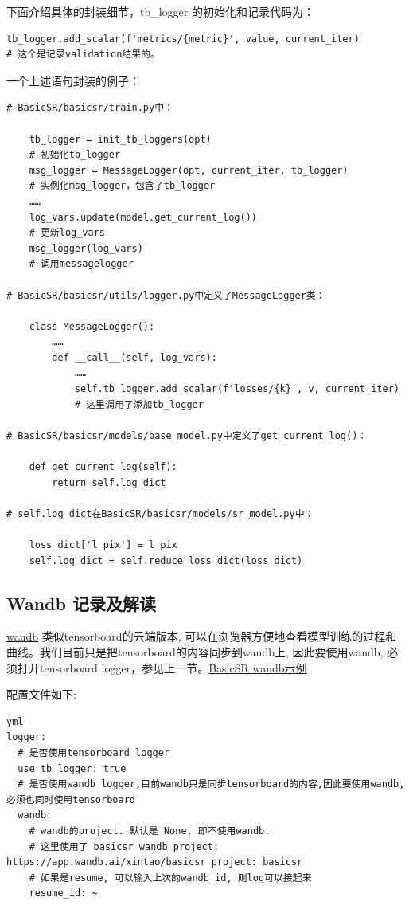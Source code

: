 \documentclass[../main.tex]{subfiles}
\begin{document}
下面介绍具体的封装细节，tb\_logger 的初始化和记录代码为：

\begin{verbatim}
tb_logger.add_scalar(f'metrics/{metric}', value, current_iter)
# 这个是记录validation结果的。
\end{verbatim}

一个上述语句封装的例子：

\begin{verbatim}
# BasicSR/basicsr/train.py中：

    tb_logger = init_tb_loggers(opt)
    # 初始化tb_logger
    msg_logger = MessageLogger(opt, current_iter, tb_logger)
    # 实例化msg_logger，包含了tb_logger
    ……
    log_vars.update(model.get_current_log())
    # 更新log_vars
    msg_logger(log_vars)
    # 调用messagelogger

# BasicSR/basicsr/utils/logger.py中定义了MessageLogger类：

    class MessageLogger():
        ……
        def __call__(self, log_vars):
            ……
            self.tb_logger.add_scalar(f'losses/{k}', v, current_iter)
            # 这里调用了添加tb_logger

# BasicSR/basicsr/models/base_model.py中定义了get_current_log()：

    def get_current_log(self):
        return self.log_dict

# self.log_dict在BasicSR/basicsr/models/sr_model.py中：

    loss_dict['l_pix'] = l_pix
    self.log_dict = self.reduce_loss_dict(loss_dict)
\end{verbatim}


\subsection{Wandb 记录及解读}

\href{https://www.wandb.com/}{wandb} 类似tensorboard的云端版本, 可以在浏览器方便地查看模型训练的过程和曲线。我们目前只是把tensorboard的内容同步到wandb上, 因此要使用wandb, 必须打开tensorboard logger，参见上一节。\href{https://wandb.ai/xintao/basicsr?workspace=user-}{BasicSR wandb示例}

配置文件如下:
\begin{verbatim}
yml
logger:
  # 是否使用tensorboard logger
  use_tb_logger: true
  # 是否使用wandb logger,目前wandb只是同步tensorboard的内容,因此要使用wandb, 必须也同时使用tensorboard
  wandb:
    # wandb的project. 默认是 None, 即不使用wandb.
    # 这里使用了 basicsr wandb project: https://app.wandb.ai/xintao/basicsr project: basicsr
    # 如果是resume, 可以输入上次的wandb id, 则log可以接起来
    resume_id: ~
\end{verbatim}
\end{document}
